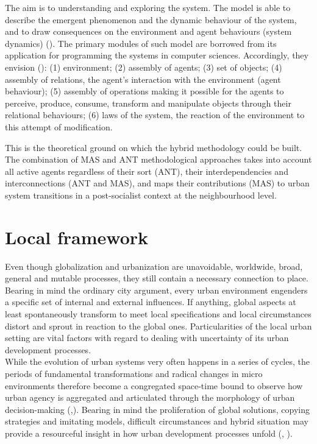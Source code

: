 \documentclass[11pt]{report}
\begin{document}
\begin{enumerate}
The aim is to understanding and exploring the system. The model is able to describe the emergent phenomenon and the dynamic behaviour of the system,  and to draw  consequences on the environment and agent behaviours (system dynamics) (\href{Diappi}{\citealt{diappi_smiths_2008}}). The primary modules of such model are borrowed from its application for programming the systems in computer sciences.
Accordingly, they envision (\href{Brown}{\citealt{brown_path_2005}}):
(1) environment;
(2) assembly of agents;
(3) set of objects;
(4) assembly of relations, the agent’s interaction with the environment (agent behaviour);
(5) assembly of operations making it possible for the agents to perceive, produce, consume, transform and manipulate objects through their relational behaviours;
(6) laws of the system, the reaction  of  the  environment  to  this  attempt  of  modification.
\end{enumerate}

This is the theoretical ground on which the hybrid methodology could be built. The combination of MAS and ANT methodological approaches takes into account all active agents regardless of their sort (ANT), their interdependencies and interconnections (ANT and MAS), and maps their contributions (MAS) to urban system transitions  in a post-socialist context at the neighbourhood level.

\section{Local framework}

Even though globalization and urbanization are unavoidable,  worldwide,  broad,  general  and  mutable  processes, they still  contain  a  necessary connection to place.
Bearing in mind the ordinary city argument, every urban environment engenders a specific set of internal and external influences.
If anything, global aspects at least spontaneously transform to meet local specifications and local circumstances distort and sprout in reaction to the global ones. Particularities of the local urban setting are vital factors with regard to dealing with uncertainty of its urban development processes.
\\

While the evolution of urban systems very often happens in a series of cycles, the periods of fundamental transformations and radical changes in micro environments therefore become a congregated space-time bound to observe how urban agency is aggregated and articulated through the morphology of urban decision-making (\href{Watson}{\citealt{watson_planning_1998}},\href{Nedovic}{\citealt{nedovicbudic_waves_2006}}).
Bearing in mind the proliferation of global solutions, copying strategies and imitating models, difficult circumstances and hybrid situation may provide a resourceful insight in how urban development processes unfold (\href{Harrison}{\citealt{partington_case_2002}}, \href{Nedovic}{\citealt{nedovicbudic_waves_2006}}).
\\
\end{document}
